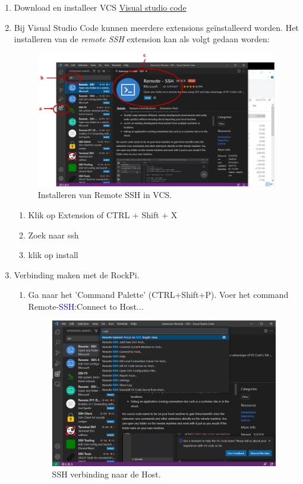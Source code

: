 \begin{enumerate}
	\item Download en installeer VCS \href{https://code.visualstudio.com/docs}{Visual studio code}
	\item Bij Visual Studio Code kunnen meerdere extensions geïnstalleerd worden. Het installeren van de \textit{remote SSH} extension kan als volgt gedaan worden:
	\begin{figure}[h!]
	\captionsetup{justification=centering}
	\includegraphics[width=0.6 \linewidth]{figuren/vcsExtSSH}
	\centering
	\caption{Installeren van Remote SSH in VCS.}
	\label{fig:vscEx}
\end{figure}


	\begin{enumerate}
		\item Klik op Extension  of CTRL + Shift + X
		\item Zoek naar ssh
		\item klik op install
	\end{enumerate}
    \item Verbinding maken met de RockPi.
	\begin{enumerate}
	    \item Ga naar het 'Command Palette' (CTRL+Shift+P). Voer het command Remote-\textcolor{blue}{SSH}:Connect to Host...
	    \begin{figure}[h!]
		\captionsetup{justification=centering}
		\includegraphics[width=0.6 \linewidth]{figuren/VNCremoteSSH}
		\centering
		\caption{SSH verbinding naar de Host.}
		\label{fig:vscConnect}
	\end{figure}


\end{enumerate}
\end{enumerate}
